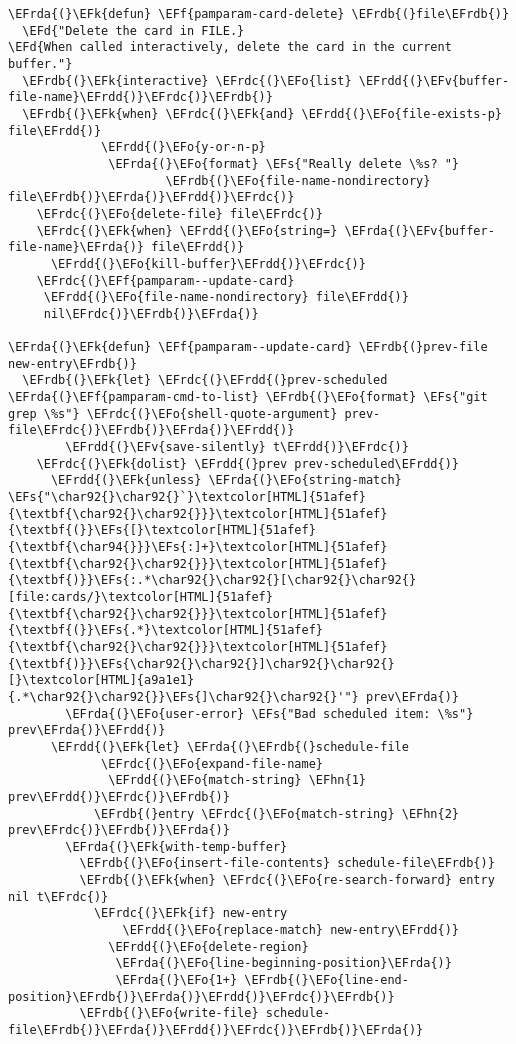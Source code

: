 \documentclass[a4wide,10pt]{article}
\newcommand{\EFs}[1]{\textcolor{EFs}{#1}} %
\newcommand{\EFd}[1]{\textcolor{EFd}{#1}} %
\newcommand{\EFk}[1]{\textcolor{EFk}{#1}} %
\newcommand{\EFf}[1]{\textcolor{EFf}{#1}} %
\newcommand{\EFv}[1]{\textcolor{EFv}{#1}} %
\newcommand{\EFo}[1]{\textcolor{EFo}{#1}} %
\newcommand{\EFhn}[1]{\textcolor{EFhn}{\textbf{#1}}} %
\newcommand{\EFrda}[1]{\textcolor{EFrda}{#1}} %
\newcommand{\EFrdb}[1]{\textcolor{EFrdb}{#1}} %
\newcommand{\EFrdc}[1]{\textcolor{EFrdc}{#1}} %
\newcommand{\EFrdd}[1]{\textcolor{EFrdd}{#1}} %
\begin{document}
\begin{Code}
\begin{Verbatim}
\EFrda{(}\EFk{defun} \EFf{pamparam-card-delete} \EFrdb{(}file\EFrdb{)}
  \EFd{"Delete the card in FILE.}
\EFd{When called interactively, delete the card in the current buffer."}
  \EFrdb{(}\EFk{interactive} \EFrdc{(}\EFo{list} \EFrdd{(}\EFv{buffer-file-name}\EFrdd{)}\EFrdc{)}\EFrdb{)}
  \EFrdb{(}\EFk{when} \EFrdc{(}\EFk{and} \EFrdd{(}\EFo{file-exists-p} file\EFrdd{)}
             \EFrdd{(}\EFo{y-or-n-p}
              \EFrda{(}\EFo{format} \EFs{"Really delete \%s? "}
                      \EFrdb{(}\EFo{file-name-nondirectory} file\EFrdb{)}\EFrda{)}\EFrdd{)}\EFrdc{)}
    \EFrdc{(}\EFo{delete-file} file\EFrdc{)}
    \EFrdc{(}\EFk{when} \EFrdd{(}\EFo{string=} \EFrda{(}\EFv{buffer-file-name}\EFrda{)} file\EFrdd{)}
      \EFrdd{(}\EFo{kill-buffer}\EFrdd{)}\EFrdc{)}
    \EFrdc{(}\EFf{pamparam--update-card}
     \EFrdd{(}\EFo{file-name-nondirectory} file\EFrdd{)}
     nil\EFrdc{)}\EFrdb{)}\EFrda{)}

\EFrda{(}\EFk{defun} \EFf{pamparam--update-card} \EFrdb{(}prev-file new-entry\EFrdb{)}
  \EFrdb{(}\EFk{let} \EFrdc{(}\EFrdd{(}prev-scheduled \EFrda{(}\EFf{pamparam-cmd-to-list} \EFrdb{(}\EFo{format} \EFs{"git grep \%s"} \EFrdc{(}\EFo{shell-quote-argument} prev-file\EFrdc{)}\EFrdb{)}\EFrda{)}\EFrdd{)}
        \EFrdd{(}\EFv{save-silently} t\EFrdd{)}\EFrdc{)}
    \EFrdc{(}\EFk{dolist} \EFrdd{(}prev prev-scheduled\EFrdd{)}
      \EFrdd{(}\EFk{unless} \EFrda{(}\EFo{string-match} \EFs{"\char92{}\char92{}`}\textcolor[HTML]{51afef}{\textbf{\char92{}\char92{}}}\textcolor[HTML]{51afef}{\textbf{(}}\EFs{[}\textcolor[HTML]{51afef}{\textbf{\char94{}}}\EFs{:]+}\textcolor[HTML]{51afef}{\textbf{\char92{}\char92{}}}\textcolor[HTML]{51afef}{\textbf{)}}\EFs{:.*\char92{}\char92{}[\char92{}\char92{}[file:cards/}\textcolor[HTML]{51afef}{\textbf{\char92{}\char92{}}}\textcolor[HTML]{51afef}{\textbf{(}}\EFs{.*}\textcolor[HTML]{51afef}{\textbf{\char92{}\char92{}}}\textcolor[HTML]{51afef}{\textbf{)}}\EFs{\char92{}\char92{}]\char92{}\char92{}[}\textcolor[HTML]{a9a1e1}{.*\char92{}\char92{}}\EFs{]\char92{}\char92{}'"} prev\EFrda{)}
        \EFrda{(}\EFo{user-error} \EFs{"Bad scheduled item: \%s"} prev\EFrda{)}\EFrdd{)}
      \EFrdd{(}\EFk{let} \EFrda{(}\EFrdb{(}schedule-file
             \EFrdc{(}\EFo{expand-file-name}
              \EFrdd{(}\EFo{match-string} \EFhn{1} prev\EFrdd{)}\EFrdc{)}\EFrdb{)}
            \EFrdb{(}entry \EFrdc{(}\EFo{match-string} \EFhn{2} prev\EFrdc{)}\EFrdb{)}\EFrda{)}
        \EFrda{(}\EFk{with-temp-buffer}
          \EFrdb{(}\EFo{insert-file-contents} schedule-file\EFrdb{)}
          \EFrdb{(}\EFk{when} \EFrdc{(}\EFo{re-search-forward} entry nil t\EFrdc{)}
            \EFrdc{(}\EFk{if} new-entry
                \EFrdd{(}\EFo{replace-match} new-entry\EFrdd{)}
              \EFrdd{(}\EFo{delete-region}
               \EFrda{(}\EFo{line-beginning-position}\EFrda{)}
               \EFrda{(}\EFo{1+} \EFrdb{(}\EFo{line-end-position}\EFrdb{)}\EFrda{)}\EFrdd{)}\EFrdc{)}\EFrdb{)}
          \EFrdb{(}\EFo{write-file} schedule-file\EFrdb{)}\EFrda{)}\EFrdd{)}\EFrdc{)}\EFrdb{)}\EFrda{)}


\end{Verbatim}
\end{Code}
\end{document}
